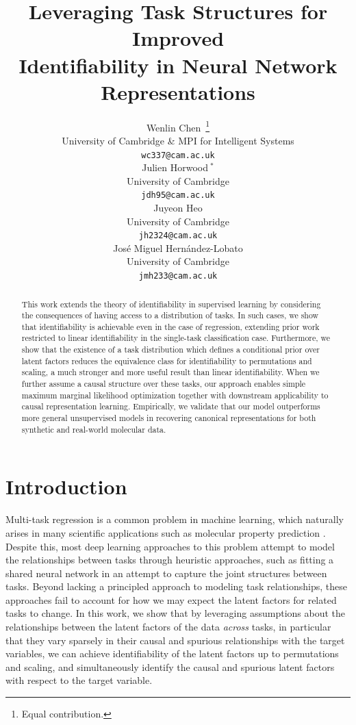\documentclass{article} %
\title{Leveraging Task Structures for Improved\\Identifiability in Neural Network \\Representations}
\author{Wenlin Chen~\thanks{Equal contribution.} \\
University of Cambridge \& MPI for Intelligent Systems \\
\texttt{wc337@cam.ac.uk} \\
\And
Julien Horwood$~^*$ \\
University of Cambridge \\
\texttt{jdh95@cam.ac.uk} \\
\AND
Juyeon Heo \\
University of Cambridge \\
\texttt{jh2324@cam.ac.uk} \\
\And
José Miguel Hernández-Lobato \\
University of Cambridge \\
\texttt{jmh233@cam.ac.uk} \\
}
\theoremstyle{plain}
\theoremstyle{definition}
\theoremstyle{remark}
\begin{document}
\maketitle

\begin{abstract}
This work extends the theory of identifiability in supervised learning by considering the consequences of having access to a distribution of tasks.
In such cases, we show that identifiability is achievable even in the case of regression, extending prior work restricted to linear identifiability in the single-task classification case.
Furthermore, we show that the existence of a task distribution which defines a conditional prior over latent factors reduces the equivalence class for identifiability to permutations and scaling, a much stronger and more useful result than linear identifiability. When we further assume a causal structure over these tasks, our approach
enables simple maximum marginal likelihood optimization together with downstream applicability to causal representation learning. 
Empirically, we validate that our model outperforms more general unsupervised models in recovering canonical representations for both 
synthetic and real-world molecular data.
\end{abstract}

\section{Introduction}

Multi-task regression is a common problem in machine learning, which naturally arises in many scientific applications such as molecular property prediction \citep{stanley2021fsmol,chen2023metalearning}. Despite this, most deep learning approaches to
this problem attempt to model the relationships between tasks through heuristic approaches, such as fitting a shared neural network in an attempt to capture the joint structures between tasks.
Beyond lacking a principled approach to modeling task relationships, these approaches fail to account for how we may expect the latent factors for related tasks to change. In this work, we show that by leveraging assumptions about the relationships between the latent factors of the data \textit{across} tasks, in particular that they vary sparsely in their causal and spurious relationships with the target variables, we can achieve identifiability of the latent factors up to permutations and scaling, and simultaneously identify the causal and spurious latent factors with respect to the target variable. 
\end{document}
